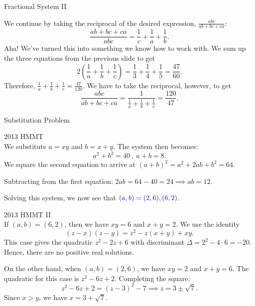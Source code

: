 \documentclass[xcolor=dvipsnames, fontsize=11pt, %
pagesize, %
parskip=half-, t]{beamer}
\begin{document}
\begin{frame}{Fractional System II}
	
	We continue by taking the reciprocal of the desired expression, $\frac{abc}{ab+bc+ca}$: $$\frac{ab+bc+ca}{abc}=\frac{1}{c}+\frac{1}{a}+\frac{1}{b}.$$ Aha! We've turned this into something we know how to work with. We sum up the three equations from the previous slide to get $$2\left(\frac1a+\frac1b+\frac1c\right)=\frac13+\frac14+\frac15=\frac{47}{60}.$$ Therefore, $\displaystyle \frac1a+\frac1b+\frac1c=\frac{47}{120}$. We have to take the reciprocal, however, to get $$\frac{abc}{ab+bc+ca}=\frac{1}{\frac1a+\frac1b+\frac1c}=\boxed{\frac{120}{47}}.$$
	
\end{frame}
	



\begin{frame}[c]{Substitution Problem}
	\centering
\end{frame}

\begin{frame}{2013 HMMT}
		 ~\\

We substitute $a=xy$ and $b=x+y$. The system then becomes: $$a^2+b^2=40\:,\: a+b=8.$$  
	We square the second equation to arrive at $(a+b)^2=a^2+2ab+b^2=64$.  \medskip
	
	Subtracting from the first equation: $2ab=64-40=24\implies ab=12.$ \medskip
	
	Solving this system, we now see that $\color{blue} (a,b)=(2,6), (6,2)$.
\end{frame}

\begin{frame}{2013 HMMT II}
			 ~\\
	If $(a,b)=(6,2)$, then we have $xy=6$ and $x+y=2$. We use the identity $$(z-x)(z-y)=z^2-z(x+y)+xy.$$ This case gives the quadratic $z^2-2z+6$ with discriminant $\Delta=2^2-4\cdot 6=-20$. Hence, there are no positive real solutions. \medskip
	
	On the other hand, when $(a,b)=(2,6)$, we have $xy=2$ and $x+y=6$. The quadratic for this case is $z^2-6z+2$. Completing the square: $$z^2-6z+2=(z-3)^2-7\implies z=3\pm \sqrt{7}.$$ Since $x>y$, we have $x=\boxed{3+\sqrt{7}}$.  
\end{frame}
\end{document}
